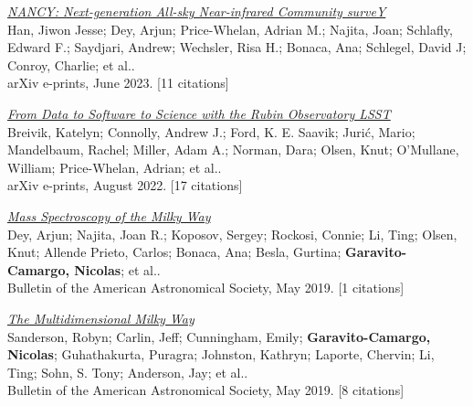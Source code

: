 \documentclass[14pt]{article}
\begin{document}
\begin{etaremune}
\item \textit{\href{https://ui.adsabs.harvard.edu/abs/2023arXiv230611784H/abstract}{NANCY: Next-generation All-sky Near-infrared Community surveY}}\\
  {\small \color{darkgray} Han, Jiwon Jesse; Dey, Arjun; Price-Whelan, Adrian M.; Najita, Joan; Schlafly, Edward F.; Saydjari, Andrew; Wechsler, Risa H.; Bonaca, Ana; Schlegel, David J; Conroy, Charlie; et al..\\
  arXiv e-prints, June 2023. [11 citations]}

\item \textit{\href{https://ui.adsabs.harvard.edu/abs/2022arXiv220802781B/abstract}{From Data to Software to Science with the Rubin Observatory LSST}}\\
  {\small \color{darkgray} Breivik, Katelyn; Connolly, Andrew J.; Ford, K. E. Saavik; Jurić, Mario; Mandelbaum, Rachel; Miller, Adam A.; Norman, Dara; Olsen, Knut; O'Mullane, William; Price-Whelan, Adrian; et al..\\
  arXiv e-prints, August 2022. [17 citations]}

\item \textit{\href{https://ui.adsabs.harvard.edu/abs/2019BAAS...51c.489D/abstract}{Mass Spectroscopy of the Milky Way}}\\
  {\small \color{darkgray} Dey, Arjun; Najita, Joan R.; Koposov, Sergey; Rockosi, Connie; Li, Ting; Olsen, Knut; Allende Prieto, Carlos; Bonaca, Ana; Besla, Gurtina; \textbf{Garavito-Camargo, Nicolas}; et al..\\
  Bulletin of the American Astronomical Society, May 2019. [1 citations]}

\item \textit{\href{https://ui.adsabs.harvard.edu/abs/2019BAAS...51c.347S/abstract}{The Multidimensional Milky Way}}\\
  {\small \color{darkgray} Sanderson, Robyn; Carlin, Jeff; Cunningham, Emily; \textbf{Garavito-Camargo, Nicolas}; Guhathakurta, Puragra; Johnston, Kathryn; Laporte, Chervin; Li, Ting; Sohn, S. Tony; Anderson, Jay; et al..\\
  Bulletin of the American Astronomical Society, May 2019. [8 citations]}

\end{etaremune}
\end{document}
